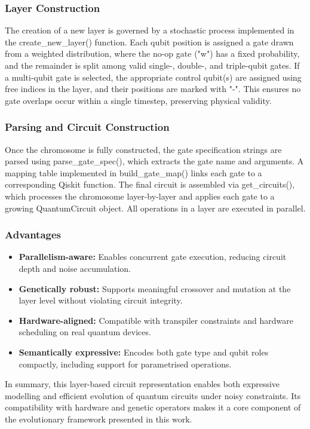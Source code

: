 \documentclass[11pt,a4paper]{article}
\begin{document}
\subsubsection*{Layer Construction}
The creation of a new layer is governed by a stochastic process implemented in the create\_new\_layer() function. Each qubit position is assigned a gate drawn from a weighted distribution, where the no-op gate ("w") has a fixed probability, and the remainder is split among valid single-, double-, and triple-qubit gates. If a multi-qubit gate is selected, the appropriate control qubit(s) are assigned using free indices in the layer, and their positions are marked with "-". This ensures no gate overlaps occur within a single timestep, preserving physical validity.

\subsubsection*{Parsing and Circuit Construction}
Once the chromosome is fully constructed, the gate specification strings are parsed using parse\_gate\_spec(), which extracts the gate name and arguments. A mapping table implemented in build\_gate\_map() links each gate to a corresponding Qiskit function. The final circuit is assembled via get\_circuits(), which processes the chromosome layer-by-layer and applies each gate to a growing QuantumCircuit object. All operations in a layer are executed in parallel.

\subsubsection*{Advantages}
\begin{itemize}
    \item \textbf{Parallelism-aware:} Enables concurrent gate execution, reducing circuit depth and noise accumulation.
    \item \textbf{Genetically robust:} Supports meaningful crossover and mutation at the layer level without violating circuit integrity.
    \item \textbf{Hardware-aligned:} Compatible with transpiler constraints and hardware scheduling on real quantum devices.
    \item \textbf{Semantically expressive:} Encodes both gate type and qubit roles compactly, including support for parametrised operations.
\end{itemize}

In summary, this layer-based circuit representation enables both expressive modelling and efficient evolution of quantum circuits under noisy constraints. Its compatibility with hardware and genetic operators makes it a core component of the evolutionary framework presented in this work.
\end{document}
